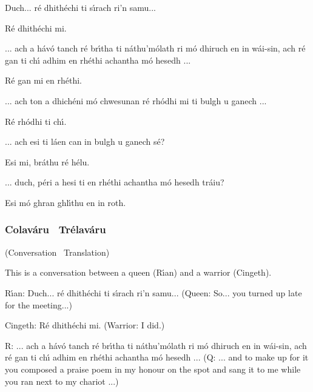 \begingroup
\fontsize{10pt}{12pt}\selectfont
\begin{leftbubbles}Duch...  r\'{e} dhith\'{e}chi ti s\'{\i}rach ri'n samu...\end{leftbubbles}
\begin{rightbubbles}R\'{e} dhith\'{e}chi mi.\end{rightbubbles}
\begin{leftbubbles}... ach a h\'{a}v\'{o} tanch r\'{e} br\'{\i}tha ti n\'{a}thu'm\'{o}lath ri m\'{o} dhiruch en in w\'{a}i-sin, ach r\'{e} gan ti ch\'{\i} adhim en rh\'{e}thi achantha m\'{o} hesedh ...\end{leftbubbles}
\begin{rightbubbles}R\'{e} gan mi en rh\'{e}thi.\end{rightbubbles}
\begin{leftbubbles}... ach ton a dhich\'{e}ni m\'{o} chwesunan r\'{e} rh\'{o}dhi mi ti bulgh u ganech ...\end{leftbubbles}
\begin{rightbubbles}R\'{e} rh\'{o}dhi ti ch\'{\i}.\end{rightbubbles}
\begin{leftbubbles}... ach esi ti l\'{a}en can in bulgh u ganech s\'{e}?\end{leftbubbles}
\begin{rightbubbles}Esi mi, br\'{a}thu r\'{e} h\'{e}lu.\end{rightbubbles}
\begin{leftbubbles}... duch, p\'{e}ri a hesi ti en rh\'{e}thi achantha m\'{o} hesedh tr\'{a}iu?\end{leftbubbles}
\begin{rightbubbles}Esi m\'{o} ghran ghl\'{\i}thu en in roth.\end{rightbubbles}
\endgroup

\newpage
\subsubsection{Colav\'{a}ru \textendash\ Tr\'{e}lav\'{a}ru}
(Conversation \textendash\ Translation)

This is a conversation between a queen (R\'{\i}an) and a warrior (Cingeth).

R\'{\i}an: Duch...  r\'{e} dhith\'{e}chi ti s\'{\i}rach ri'n samu...
(Queen: So... you turned up late for the meeting...)

Cingeth: R\'{e} dhith\'{e}chi mi.
(Warrior: I did.)

R: ... ach a h\'{a}v\'{o} tanch r\'{e} br\'{\i}tha ti n\'{a}thu'm\'{o}lath ri m\'{o} dhiruch en in w\'{a}i-sin, ach r\'{e} gan ti ch\'{\i} adhim en rh\'{e}thi achantha m\'{o} hesedh ...
(Q: ... and to make up for it you composed a praise poem in my honour on the spot and sang it to me while you ran next to my chariot ...)

